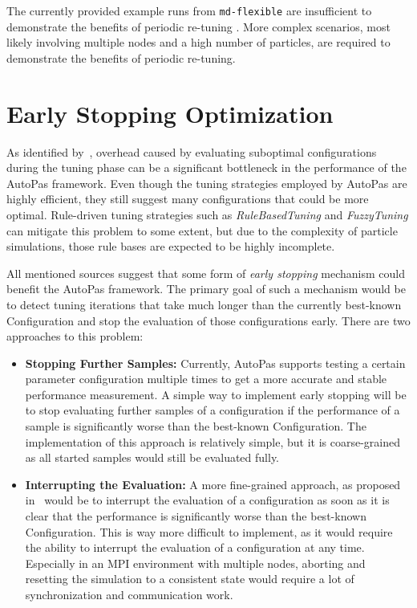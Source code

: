 \documentclass[conference]{IEEEtran}
\begin{document}
The currently provided example runs from \texttt{md-flexible} are insufficient to demonstrate the benefits of periodic re-tuning . More complex scenarios, most likely involving multiple nodes and a high number of particles, are required to demonstrate the benefits of periodic re-tuning.

\newpage
\newpage


\section{Early Stopping Optimization}

As identified by~\cite{autopas_issue673}\cite{endreport.pdf}\cite{Manuel_Lerchner_Thesis.pdf}, overhead caused by evaluating suboptimal configurations during the tuning phase can be a significant bottleneck in the performance of the AutoPas framework. Even though the tuning strategies employed by AutoPas are highly efficient, they still suggest many configurations that could be more optimal. Rule-driven tuning strategies such as \textit{RuleBasedTuning} and \textit{FuzzyTuning} can mitigate this problem to some extent, but due to the complexity of particle simulations, those rule bases are expected to be highly incomplete.

All mentioned sources suggest that some form of \textit{early stopping} mechanism could benefit the AutoPas framework. The primary goal of such a mechanism would be to detect tuning iterations that take much longer than the currently best-known Configuration and stop the evaluation of those configurations early. There are two approaches to this problem:

\begin{itemize}
    \item \textbf{Stopping Further Samples:} Currently, AutoPas supports testing a certain parameter configuration multiple times to get a more accurate and stable performance measurement. A simple way to implement early stopping will be to stop evaluating further samples of a configuration if the performance of a sample is significantly worse than the best-known Configuration. The implementation of this approach is relatively simple, but it is coarse-grained as all started samples would still be evaluated fully.
    \item \textbf{Interrupting the Evaluation:} A more fine-grained approach, as proposed in~\cite{endreport.pdf} would be to interrupt the evaluation of a configuration as soon as it is clear that the performance is significantly worse than the best-known Configuration. This is way more difficult to implement, as it would require the ability to interrupt the evaluation of a configuration at any time. Especially in an MPI environment with multiple nodes, aborting and resetting the simulation to a consistent state would require a lot of synchronization and communication work.
\end{itemize}
\end{document}
